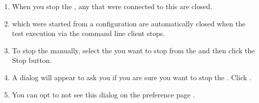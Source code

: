 \begin{enumerate}
\item When you stop the \gdagent{}, any \gdauts{} that were connected to this \gdagent{} are closed.
\item \gdauts{} which were started from a \gd{} configuration are automatically closed when the test execution via the command line client stops.
\item To stop the \gdaut{} manually, select the \gdaut{} you want to stop from the \gdrunautview{} and then click the {Stop \gdaut{}} button. 
\item A dialog will appear to ask you if you are sure you want to stop the \gdaut{}. Click . 
\item You can opt to not see this dialog on the \gd{} preference page . 
\end{enumerate}
